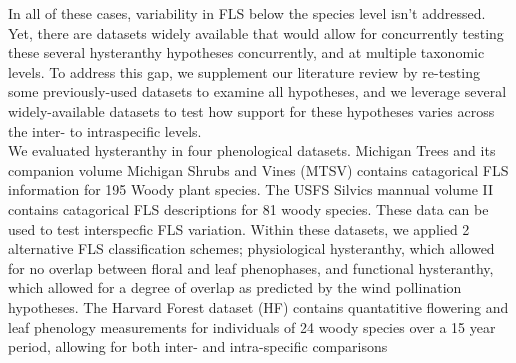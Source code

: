 \documentclass[12pt]{article}\usepackage[]{graphicx}\usepackage[]{color}
\begin{document}
\indent In all of these cases, variability in FLS below the species level isn't addressed. Yet, there are datasets widely available that would allow for concurrently testing these several hysteranthy hypotheses concurrently, and at multiple taxonomic levels. To address this gap, we supplement our literature review by re-testing some previously-used datasets to examine all hypotheses, and we leverage several widely-available datasets to test how support for these hypotheses varies across the inter- to intraspecific levels.\\ 
\indent We evaluated hysteranthy in four phenological datasets. Michigan Trees and its companion volume Michigan Shrubs and Vines \citep{Barnes2004,Barnes2016} (MTSV) contains catagorical FLS information for 195 Woody plant species. The USFS Silvics mannual volume II \citep{Burns1990} contains catagorical FLS descriptions for 81 woody species. These data can be used to test interspecfic FLS variation. Within these datasets, we applied 2 alternative FLS classification schemes; physiological hysteranthy, which allowed for no overlap between floral and leaf phenophases, and functional hysteranthy, which allowed for a degree of overlap as predicted by the wind pollination hypotheses. The Harvard Forest dataset (HF) contains quantatitive flowering and leaf phenology measurements for individuals of 24 woody species over a 15 year period, allowing for both inter- and intra-specific comparisons \citep{Okeefe2015. In this dataset, we approximated the two hysteranthy classification schemes mentioned by measuring the temporal offset between different floral and leaf phenophases. From the Pan European Phenological Database (PEP725) (look up citation) we obtained spatially and temporally explicit, quantitative flowering and leaf phenology for 3 European hysteranthous species. This allows for test only at the intra-specific level, but unlike the other datasets, it allows for population level variability to be assessed.
}
\end{document}
